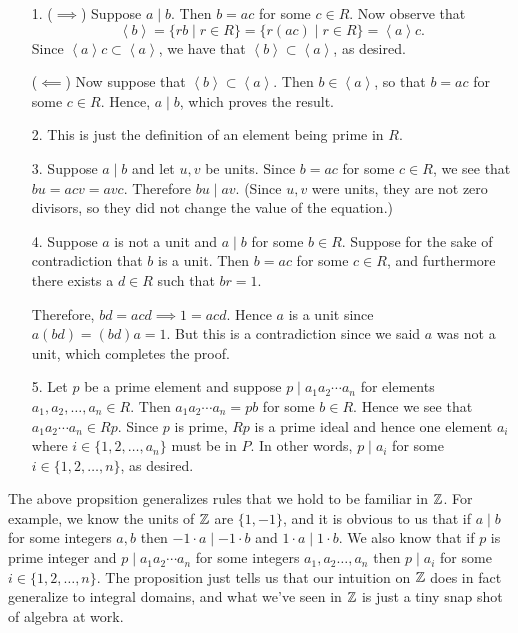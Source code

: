 \begin{prf}
\begin{itemize}
    \item[1.] ($\implies$) Suppose $a \mid b$. Then $b = ac$ for some $c \in
    R$. Now observe that 
    \[
        \left< b \right> = \{rb \mid r \in R\} = \{r(ac) \mid r \in R\} = \left<a\right>c.
    \]
    Since $\left< a \right>c \subset \left< a \right>$, we have
    that $\left< b \right> \subset \left< a \right>$, as desired.
    
    ($\impliedby$) Now suppose that $\left< b \right> \subset
    \left< a \right>$. Then $b \in \left< a \right>$, so that $b =
    ac$ for some $c \in R$. Hence, $a \mid b$, which proves the
    result. 

    \item[2.] This is just the definition of an
    element being prime in $R$. 

    \item[3.] Suppose $a \mid b$ and let $u, v$ be units. Since $b
    = ac$ for some $c\in R$, we see that $bu = acv = avc$.
    Therefore $bu \mid av$. (Since $u, v$ were units, they are not
    zero divisors, so they did not change the value of the
    equation.)

    \item[4.] Suppose $a$ is not a unit and $a \mid b$ for some $b
    \in R$. Suppose for the sake of contradiction that $b$ is a
    unit. Then $b = ac$ for some $c \in R$, and furthermore there
    exists a $d \in R$ such that $br = 1$. 

    Therefore, $bd = acd \implies 1 = acd$. Hence $a$ is a unit
    since $a(bd) = (bd)a= 1$. But this is a contradiction since we
    said $a$ was not a unit, which completes the proof. 

    \item[5.] Let $p$ be a prime element and suppose $p \mid
    a_1a_2 \cdots a_n$ for elements $a_1, a_2, \dots, a_n \in R$. 
    Then $a_1a_2\cdots a_n = pb$ for some $b \in R$. Hence we see
    that $a_1a_2\cdots a_n \in Rp$. Since $p$ is prime, $Rp$ is a
    prime ideal and hence one element $a_i$ where $i \in \{1, 2,
    \dots, a_n\}$ must be in $P$. In other words, $p \mid a_i$ for
    some $i \in \{1, 2, \dots, n\}$, as desired. 
\end{itemize}
\end{prf}

The above propsition generalizes rules that we hold to be familiar
in $\mathbb{Z}$. For example, we know the units of $\mathbb{Z}$ are $\{1, -1\}$,
and it is obvious to us that if $a \mid b$ for some integers $a,
b$ then $-1\cdot a \mid -1\cdot b$ and $1 \cdot a \mid 1 \cdot b$.
We also know that if $p$ is prime integer and $p \mid a_1a_2\cdots
a_n$ for some integers $a_1, a_2 \dots, a_n$ then $p \mid a_i$ for
some $i \in \{1, 2, \dots, n\}$. The proposition just tells us
that our intuition on $\mathbb{Z}$ does in fact generalize to integral
domains, and what we've seen in $\mathbb{Z}$ is just a tiny snap shot of
algebra at work.

